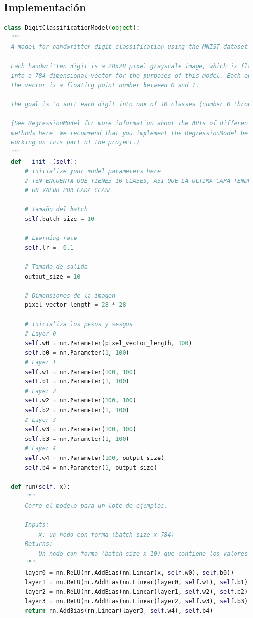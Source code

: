 \documentclass{report}
\begin{document}
      \subsection*{Implementación}
        \begin{lstlisting}[language=Python, caption=Implementación de la clasificación de dígitos]
class DigitClassificationModel(object):
  """
  A model for handwritten digit classification using the MNIST dataset.

  Each handwritten digit is a 28x28 pixel grayscale image, which is flattened
  into a 784-dimensional vector for the purposes of this model. Each entry in
  the vector is a floating point number between 0 and 1.

  The goal is to sort each digit into one of 10 classes (number 0 through 9).

  (See RegressionModel for more information about the APIs of different
  methods here. We recommend that you implement the RegressionModel before
  working on this part of the project.)
  """
  def __init__(self):
      # Initialize your model parameters here
      # TEN ENCUENTA QUE TIENES 10 CLASES, ASI QUE LA ULTIMA CAPA TENDRA UNA SALIDA DE 10 VALORES,
      # UN VALOR POR CADA CLASE

      # Tamaño del batch
      self.batch_size = 10
      
      # Learning rate
      self.lr = -0.1

      # Tamaño de salida
      output_size = 10
      
      # Dimensiones de la imagen
      pixel_vector_length = 28 * 28

      # Inicializa los pesos y sesgos
      # Layer 0
      self.w0 = nn.Parameter(pixel_vector_length, 100)
      self.b0 = nn.Parameter(1, 100)
      # Layer 1
      self.w1 = nn.Parameter(100, 100)
      self.b1 = nn.Parameter(1, 100)
      # Layer 2
      self.w2 = nn.Parameter(100, 100)
      self.b2 = nn.Parameter(1, 100)
      # Layer 3
      self.w3 = nn.Parameter(100, 100)
      self.b3 = nn.Parameter(1, 100)
      # Layer 4
      self.w4 = nn.Parameter(100, output_size)
      self.b4 = nn.Parameter(1, output_size)

  def run(self, x):
      """
      Corre el modelo para un lote de ejemplos.
      
      Inputs:
          x: un nodo con forma (batch_size x 784)
      Returns:
          Un nodo con forma (batch_size x 10) que contiene los valores predichos de y.
      """
      layer0 = nn.ReLU(nn.AddBias(nn.Linear(x, self.w0), self.b0))
      layer1 = nn.ReLU(nn.AddBias(nn.Linear(layer0, self.w1), self.b1))
      layer2 = nn.ReLU(nn.AddBias(nn.Linear(layer1, self.w2), self.b2))
      layer3 = nn.ReLU(nn.AddBias(nn.Linear(layer2, self.w3), self.b3))
      return nn.AddBias(nn.Linear(layer3, self.w4), self.b4)


\end{lstlisting}
\end{document}
